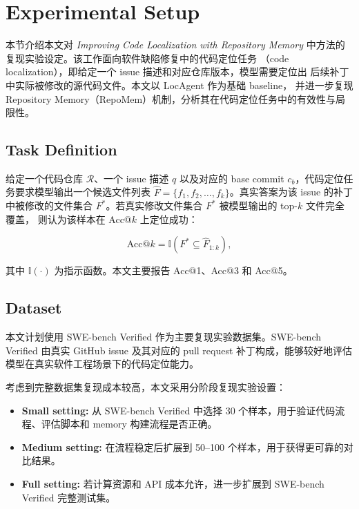 \section{Experimental Setup}
\label{sec:experimental_setup}

本节介绍本文对 \textit{Improving Code Localization with Repository Memory}
中方法的复现实验设定。该工作面向软件缺陷修复中的代码定位任务
（code localization），即给定一个 issue 描述和对应仓库版本，模型需要定位出
后续补丁中实际被修改的源代码文件。本文以 LocAgent 作为基础 baseline，
并进一步复现 Repository Memory（RepoMem）机制，分析其在代码定位任务中的有效性与局限性。

\subsection{Task Definition}
\label{subsec:task_definition}

给定一个代码仓库 $\mathcal{R}$、一个 issue 描述 $q$ 以及对应的
base commit $c_b$，代码定位任务要求模型输出一个候选文件列表
$\hat{F} = \{f_1, f_2, \ldots, f_k\}$。真实答案为该 issue 的补丁中被修改的文件集合
$F^\ast$。若真实修改文件集合 $F^\ast$ 被模型输出的 top-$k$ 文件完全覆盖，
则认为该样本在 Acc@$k$ 上定位成功：

\begin{equation}
    \text{Acc@}k =
    \mathbb{I}(F^\ast \subseteq \hat{F}_{1:k}),
\end{equation}

其中 $\mathbb{I}(\cdot)$ 为指示函数。本文主要报告 Acc@1、Acc@3 和 Acc@5。

\subsection{Dataset}
\label{subsec:dataset}

本文计划使用 SWE-bench Verified 作为主要复现实验数据集。SWE-bench Verified
由真实 GitHub issue 及其对应的 pull request 补丁构成，能够较好地评估模型在真实软件工程场景下的代码定位能力。

考虑到完整数据集复现成本较高，本文采用分阶段复现实验设置：

\begin{itemize}
    \item \textbf{Small setting:} 从 SWE-bench Verified 中选择 30 个样本，用于验证代码流程、评估脚本和 memory 构建流程是否正确。
    \item \textbf{Medium setting:} 在流程稳定后扩展到 50--100 个样本，用于获得更可靠的对比结果。
    \item \textbf{Full setting:} 若计算资源和 API 成本允许，进一步扩展到 SWE-bench Verified 完整测试集。
\end{itemize}

